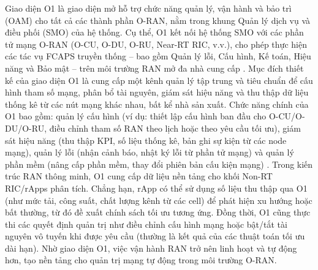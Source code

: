 Giao diện O1 là giao diện mở hỗ trợ chức năng quản lý, vận hành và bảo trì (OAM) cho tất cả các thành phần O-RAN, nằm trong khung Quản lý dịch vụ và điều phối (SMO) của hệ thống. Cụ thể, O1 kết nối hệ thống SMO với các phần tử mạng O-RAN (O-CU, O-DU, O-RU, Near-RT RIC, v.v.), cho phép thực hiện các tác vụ FCAPS truyền thống – bao gồm Quản lý lỗi, Cấu hình, Kế toán, Hiệu năng và Bảo mật – trên môi trường RAN mở đa nhà cung cấp \cite{frontiers}. Mục đích thiết kế của giao diện O1 là cung cấp một kênh quản lý tập trung và tiêu chuẩn để cấu hình tham số mạng, phân bổ tài nguyên, giám sát hiệu năng và thu thập dữ liệu thống kê từ các nút mạng khác nhau, bất kể nhà sản xuất. Chức năng chính của O1 bao gồm: quản lý cấu hình (ví dụ: thiết lập cấu hình ban đầu cho O-CU/O-DU/O-RU, điều chỉnh tham số RAN theo lịch hoặc theo yêu cầu tối ưu), giám sát hiệu năng (thu thập KPI, số liệu thống kê, bản ghi sự kiện từ các node mạng), quản lý lỗi (nhận cảnh báo, nhật ký lỗi từ phần tử mạng) và quản lý phần mềm (nâng cấp phần mềm, thay đổi phiên bản cấu kiện mạng) \cite{frontiers}. Trong kiến trúc RAN thông minh, O1 cung cấp dữ liệu nền tảng cho khối Non-RT RIC/rApps phân tích. Chẳng hạn, rApp có thể sử dụng số liệu thu thập qua O1 (như mức tải, công suất, chất lượng kênh từ các cell) để phát hiện xu hướng hoặc bất thường, từ đó đề xuất chính sách tối ưu tương ứng. Đồng thời, O1 cũng thực thi các quyết định quản trị như điều chỉnh cấu hình mạng hoặc bật/tắt tài nguyên vô tuyến khi được yêu cầu (thường là kết quả của các thuật toán tối ưu dài hạn). Nhờ giao diện O1, việc vận hành RAN trở nên linh hoạt và tự động hơn, tạo nền tảng cho quản trị mạng tự động trong môi trường O-RAN. 


